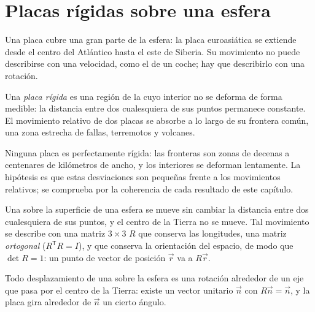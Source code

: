 \section{Placas rígidas sobre una esfera}

Una placa cubre una gran parte de la esfera: la placa euroasiática se extiende desde el centro del Atlántico hasta el este de Siberia.
Su movimiento no puede describirse con una velocidad, como el de un coche; hay que describirlo con una rotación.

\begin{definition}\label{def:b1:plate-kinematics:rigid-plate}
Una \emph{placa rígida} es una región de la  cuyo interior no se deforma de forma medible: la distancia
entre dos cualesquiera de sus puntos permanece constante. El movimiento relativo de dos placas se absorbe a lo largo de su frontera
común, una zona estrecha de fallas, terremotos y volcanes.
\end{definition}

Ninguna placa es perfectamente rígida: las fronteras son zonas de decenas a centenares de kilómetros de ancho, y los interiores se
deforman lentamente. La hipótesis es que estas desviaciones son pequeñas frente a los movimientos relativos; se comprueba por la
coherencia de cada resultado de este capítulo.

Una  sobre la superficie de una esfera se mueve sin cambiar la distancia entre dos cualesquiera de sus puntos, y el centro
de la Tierra no se mueve. Tal movimiento se describe con una matriz $3\times3$ $R$ que conserva las longitudes, una matriz
\emph{ortogonal} ($R^{\mathsf T}R = I$), y que conserva la orientación del espacio, de modo que $\det R = 1$: un punto de vector de
posición $\vec r$ va a $R\vec r$.

\begin{theorem}\label{thm:b1:plate-kinematics:euler}
Todo desplazamiento de una  sobre la esfera es una rotación alrededor de un eje que pasa por el centro de la Tierra: existe
un vector unitario $\vec n$ con $R\vec n = \vec n$, y la placa gira alrededor de $\vec n$ un cierto ángulo.
\end{theorem}

